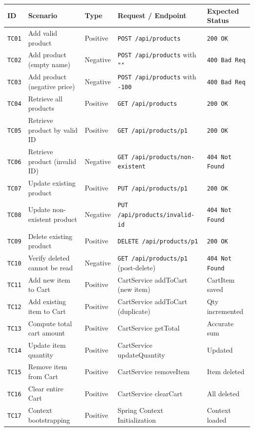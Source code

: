 \documentclass[12pt,a4paper]{article}
\begin{document}
\begin{center}
\small
\begin{tabularx}{\linewidth}{lllXl}
  \toprule
  \textbf{ID} & \textbf{Scenario} & \textbf{Type} & \textbf{Request / Endpoint} & \textbf{Expected Status} \\
  \midrule
  \texttt{TC01} & Add valid product & Positive & \texttt{POST /api/products} & \texttt{200 OK} \\
  \texttt{TC02} & Add product (empty name) & Negative & \texttt{POST /api/products} with \texttt{""} & \texttt{400 Bad Req} \\
  \texttt{TC03} & Add product (negative price)& Negative & \texttt{POST /api/products} with \texttt{-100} & \texttt{400 Bad Req} \\
  \texttt{TC04} & Retrieve all products & Positive & \texttt{GET /api/products} & \texttt{200 OK} \\
  \texttt{TC05} & Retrieve product by valid ID & Positive & \texttt{GET /api/products/p1} & \texttt{200 OK} \\
  \texttt{TC06} & Retrieve product (invalid ID)& Negative & \texttt{GET /api/products/non-existent}& \texttt{404 Not Found} \\
  \texttt{TC07} & Update existing product & Positive & \texttt{PUT /api/products/p1} & \texttt{200 OK} \\
  \texttt{TC08} & Update non-existent product & Negative & \texttt{PUT /api/products/invalid-id} & \texttt{404 Not Found} \\
  \texttt{TC09} & Delete existing product & Positive & \texttt{DELETE /api/products/p1} & \texttt{200 OK} \\
  \texttt{TC10} & Verify deleted cannot be read & Negative & \texttt{GET /api/products/p1} (post-delete) & \texttt{404 Not Found} \\
  \midrule
  \texttt{TC11} & Add new item to Cart & Positive & CartService addToCart (new item) & CartItem saved \\
  \texttt{TC12} & Add existing item to Cart & Positive & CartService addToCart (duplicate) & Qty incremented \\
  \texttt{TC13} & Compute total cart amount & Positive & CartService getTotal & Accurate sum \\
  \texttt{TC14} & Update item quantity & Positive & CartService updateQuantity & Updated \\
  \texttt{TC15} & Remove item from Cart & Positive & CartService removeItem & Item deleted \\
  \texttt{TC16} & Clear entire Cart & Positive & CartService clearCart & All deleted \\
  \texttt{TC17} & Context bootstrapping & Positive & Spring Context Initialization & Context loaded \\
  \bottomrule
\end{tabularx}
\end{center}
\end{document}
